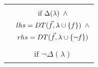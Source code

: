\begin{tabular}{ m{2cm} m{3cm} }
    \centering{}
    &
    \begin{equation*}
        \begin{gathered}
        \text{if } \Delta (\lambda) \enskip \land \\
        lhs=DT(\vec{f}, \lambda \cup \{f\})\enskip\land \\
        rhs=DT(\vec{f}, \lambda \cup \{\lnot f\})
        \end{gathered}
    \end{equation*}
    \\
    \hspace*{-0.14in}
    \centering{}
    &
    \begin{equation*}
        \begin{gathered}
        \text{if } \lnot \Delta (\lambda)
        \end{gathered}
    \end{equation*}
    \\
\end{tabular}